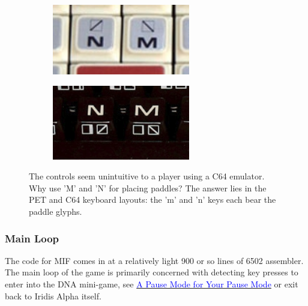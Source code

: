 \begin{figure}[H]
  {
    \setlength{\tabcolsep}{3.0pt}
    \setlength\cmidrulewidth{\heavyrulewidth} %
	\centering
	\begin{subfigure}{0.5\textwidth}
      \includegraphics[width=6cm]{src/mif/pet_nm.jpg}%
	\end{subfigure}
	\begin{subfigure}{0.5\textwidth}
      \includegraphics[width=6cm]{src/mif/c64_nm.jpg}%
	\end{subfigure}
  }
\caption{ The controls seem unintuitive to a player using a C64 emulator. Why use 'M' and 'N' for placing paddles? The answer lies in the PET
and C64 keyboard layouts: the 'm' and 'n' keys each bear the paddle glyphs.
}
\end{figure}

\subsubsection{Main Loop}
The code for MIF comes in at a relatively light 900 or so lines of 6502
assembler. The main loop of the game is primarily concerned with detecting key
presses to enter into the DNA mini-game, see
\hyperref[sec:dna]{\textcolor{blue}{A Pause Mode for Your Pause Mode}} or exit
back to Iridis Alpha itself.

